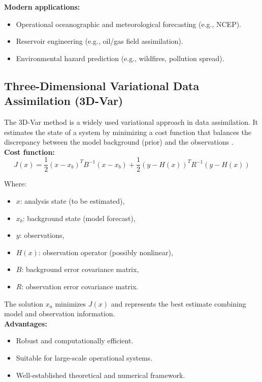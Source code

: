 \documentclass[a4paper]{article}
\begin{document}
\textbf{Modern applications:}\\

\begin{itemize}
  \item Operational oceanographic and meteorological forecasting (e.g., NCEP).
  \item Reservoir engineering (e.g., oil/gas field assimilation).
  \item Environmental hazard prediction (e.g., wildfires, pollution spread).
\end{itemize}


\subsection{Three-Dimensional Variational Data Assimilation (3D-Var)}

The 3D-Var method is a widely used variational approach in data assimilation. It estimates the state of a system 
by minimizing a cost function that balances the discrepancy between the model background (prior) and the 
observations \parencite{lorenc1986analysis, courtier1994strategy}.\\

\textbf{Cost function:}\\

\[
J(x) = \frac{1}{2}(x - x_b)^T B^{-1} (x - x_b) + \frac{1}{2}(y - H(x))^T R^{-1} (y - H(x))
\]

Where:\\

\begin{itemize}
  \item $x$: analysis state (to be estimated),
  \item $x_b$: background state (model forecast),
  \item $y$: observations,
  \item $H(x)$: observation operator (possibly nonlinear),
  \item $B$: background error covariance matrix,
  \item $R$: observation error covariance matrix.
\end{itemize}

The solution $x_a$ minimizes $J(x)$ and represents the best estimate combining model and observation information.\\

\textbf{Advantages:}\\

\begin{itemize}
  \item Robust and computationally efficient.
  \item Suitable for large-scale operational systems.
  \item Well-established theoretical and numerical framework.
\end{itemize}
\end{document}
